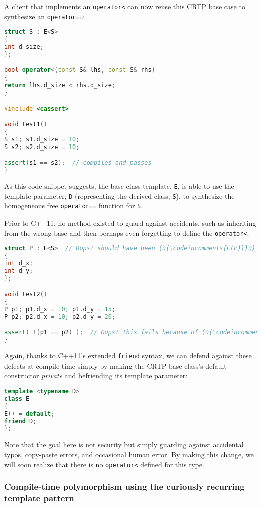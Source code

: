 \noindent A client that implements an \texttt{operator<} can now reuse this CRTP
base case to synthesize an \texttt{operator==}:

\begin{lstlisting}[language=C++]
struct S : E<S>
{
int d_size;
};

bool operator<(const S& lhs, const S& rhs)
{
return lhs.d_size < rhs.d_size;
}

#include <cassert>

void test1()
{
S s1; s1.d_size = 10;
S s2; s2.d_size = 10;

assert(s1 == s2);  // compiles and passes
}
\end{lstlisting}

\noindent As this code snippet suggests, the base-class template, \texttt{E}, is
able to use the template parameter, \texttt{D} (representing the derived
class, \texttt{S}), to synthesize the homogeneous free
\texttt{operator==} function for \texttt{S}.

Prior to C++11, no method existed to guard against accidents, such as
inheriting from the wrong base and then perhaps even forgetting to
define the \texttt{operator<}:

\begin{lstlisting}[language=C++]
struct P : E<S>  // Oops! should have been (ù{\codeincomments{E(P)}}ù) -- a serious latent defect
{
int d_x;
int d_y;
};

void test2()
{
P p1; p1.d_x = 10; p1.d_y = 15;
P p2; p2.d_x = 10; p2.d_y = 20;

assert( !(p1 == p2) );  // Oops! This fails because of (ù{\codeincomments{E(S)}}ù) above.
}
\end{lstlisting}

\noindent Again, thanks to C++11's extended \texttt{friend} syntax, we can defend
against these defects at compile time simply by making the CRTP base
class's default constructor \emph{private} and befriending its template
parameter:

\begin{lstlisting}[language=C++]
template <typename D>
class E
{
E() = default;
friend D;
};
\end{lstlisting}

\noindent Note that the goal here is not security but simply guarding against
accidental typos, copy-paste errors, and occasional  human error. By making this change, we will soon realize that there
is no \texttt{operator<} defined for this type.

\subsubsection[Compile-time polymorphism using the curiously recurring template pattern]{Compile-time polymorphism using the curiously recurring template pattern}\label{compile-time-polymorphism-using-crtp}


